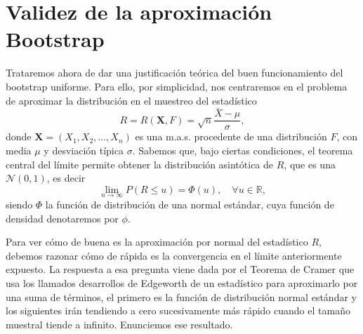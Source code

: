 \documentclass[
]{book}
\renewcommand{\mathbf}[1]{\symbf{#1}}
\theoremstyle{break}
\theoremstyle{nonumberplain}
\begin{document}
\section{Validez de la aproximación Bootstrap}\label{validez-de-la-aproximaciuxf3n-bootstrap}

Trataremos ahora de dar una justificación teórica del buen
funcionamiento del bootstrap uniforme. Para ello, por simplicidad, nos
centraremos en el problema de aproximar la distribución en el muestreo
del estadístico
\[R=R\left( \mathbf{X},F \right) =\sqrt{n}\frac{\bar{X}-\mu }{\sigma },\]
donde \(\mathbf{X}=\left( X_1,X_2,\ldots ,X_n \right)\) es una
m.a.s. procedente de una distribución \(F\), con media \(\mu\) y desviación
típica \(\sigma\). Sabemos que, bajo ciertas condiciones, el teorema
central del límite permite obtener la distribución asintótica de \(R\),
que es una \(\mathcal{N}\left( 0,1 \right)\), es decir
\[\lim_{n\rightarrow \infty }P\left( R\leq u \right) =\Phi \left( u \right),
\quad\forall u\in \mathbb{R},\]
siendo \(\Phi\) la función de distribución de una normal estándar, cuya
función de densidad denotaremos por \(\phi\).

Para ver cómo de buena es la aproximación por normal del estadístico
\(R\), debemos razonar cómo de rápida es la convergencia en el límite
anteriormente expuesto. La respuesta a esa pregunta viene dada por el
Teorema de Cramer que usa los llamados desarrollos de Edgeworth de un
estadístico para aproximarlo por una suma de términos, el primero es la
función de distribución normal estándar y los siguientes irán tendiendo
a cero sucesivamente más rápido cuando el tamaño muestral tiende a
infinito. Enunciemos ese resultado.
\end{document}
